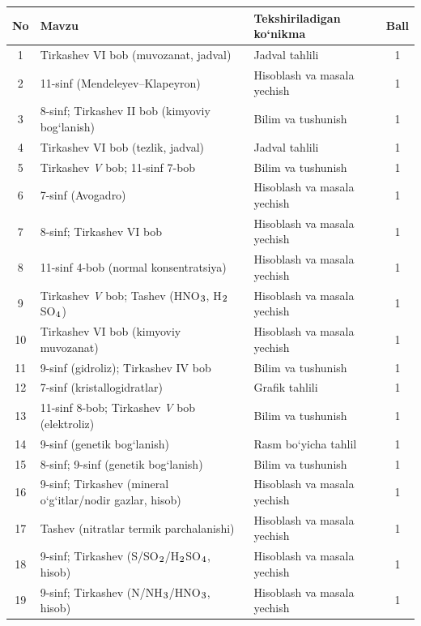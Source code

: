 \documentclass[11pt,a4paper]{article}
\renewcommand{\textsubscript}[1]{\ensuremath{_{\text{\fontsize{8}{8}\selectfont #1}}}}
\begin{document}
{\small\noindent\begin{longtable}{|c|p{7.2cm}|p{5.4cm}|c|}\hline \textbf{No} & \textbf{Mavzu} & \textbf{Tekshiriladigan ko`nikma} & \textbf{Ball}\\\hline
1 & Tirkashev VI bob (muvozanat, jadval) & Jadval tahlili & 1\\\hline
2 & 11-sinf (Mendeleyev--Klapeyron) & Hisoblash va masala yechish & 1\\\hline
3 & 8-sinf; Tirkashev II bob (kimyoviy bog`lanish) & Bilim va tushunish & 1\\\hline
4 & Tirkashev VI bob (tezlik, jadval) & Jadval tahlili & 1\\\hline
5 & Tirkashev \textit{V} bob; 11-sinf 7-bob & Bilim va tushunish & 1\\\hline
6 & 7-sinf (Avogadro) & Hisoblash va masala yechish & 1\\\hline
7 & 8-sinf; Tirkashev VI bob & Hisoblash va masala yechish & 1\\\hline
8 & 11-sinf 4-bob (normal konsentratsiya) & Hisoblash va masala yechish & 1\\\hline
9 & Tirkashev \textit{V} bob; Tashev (HNO\textsubscript{3}, H\textsubscript{2}SO\textsubscript{4}) & Hisoblash va masala yechish & 1\\\hline
10 & Tirkashev VI bob (kimyoviy muvozanat) & Hisoblash va masala yechish & 1\\\hline
11 & 9-sinf (gidroliz); Tirkashev IV bob & Bilim va tushunish & 1\\\hline
12 & 7-sinf (kristallogidratlar) & Grafik tahlili & 1\\\hline
13 & 11-sinf 8-bob; Tirkashev \textit{V} bob (elektroliz) & Bilim va tushunish & 1\\\hline
14 & 9-sinf (genetik bog`lanish) & Rasm bo`yicha tahlil & 1\\\hline
15 & 8-sinf; 9-sinf (genetik bog`lanish) & Bilim va tushunish & 1\\\hline
16 & 9-sinf; Tirkashev (mineral o`g`itlar/nodir gazlar, hisob) & Hisoblash va masala yechish & 1\\\hline
17 & Tashev (nitratlar termik parchalanishi) & Hisoblash va masala yechish & 1\\\hline
18 & 9-sinf; Tirkashev (S/SO\textsubscript{2}/H\textsubscript{2}SO\textsubscript{4}, hisob) & Hisoblash va masala yechish & 1\\\hline
19 & 9-sinf; Tirkashev (N/NH\textsubscript{3}/HNO\textsubscript{3}, hisob) & Hisoblash va masala yechish & 1\\\hline

\end{longtable}}
\end{document}
